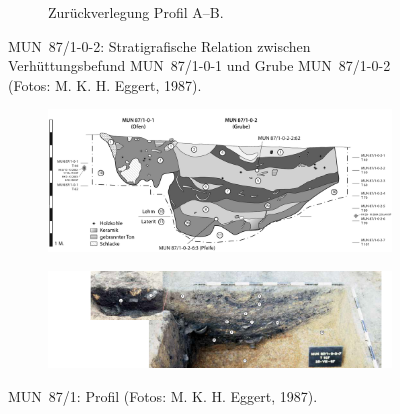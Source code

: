 \begin{figure}[p]
\begin{minipage}[b]{.55\textwidth}
\begin{subfigure}[t]{.47\textwidth}
			\caption{Zurückverlegung Profil A--B.}
			\label{fig:MUN87-1_3Pl_T40Profil_E}
		\end{subfigure}	
	\end{minipage}
	\caption{MUN~87/1-0-2: Stratigrafische Relation zwischen Verhüttungsbefund MUN~87/1-0-1 und Grube MUN~87/1-0-2 (Fotos: M. K. H. Eggert, 1987).}
	\label{fig:MUN87-1_Querprofil_Zeichnung+Foto}
\end{figure}

\begin{figure}[p]
	\centering
	\begin{subfigure}[t]{.75\textwidth}
		\centering
		\includegraphics[width = \textwidth]{fig/MUN87-1_Profil_A.pdf}
		\caption{}
		\label{fig:MUN87-1_Profil_A}
	\end{subfigure}
	\begin{subfigure}[t]{.8\textwidth}
		\centering
		\includegraphics[width = \textwidth]{fig/MUN87-1_Profil_B.pdf}
		\caption{}
		\label{fig:MUN87-1_Profil_B}
	\end{subfigure}	
	\caption{MUN~87/1: Profil (Fotos: M. K. H. Eggert, 1987).}
	\label{fig:MUN87-1_Profil_Zeichnung}
\end{figure}

\begin{table}[p]
	\caption{MUN~87/1: Konkordanzliste für die Schicht-Nummerierung des Quer- (Abb.~\ref{fig:MUN87-1_3Pl_T40Profil_B}, \ref{fig:MUN87-1_3Pl_T40Profil_D}) und Längsprofils (Abb.~\ref{fig:MUN87-1_Profil_Zeichnung}).}
	\label{tab:MUN87-1_Konkordanz-Profile}
\end{table}

